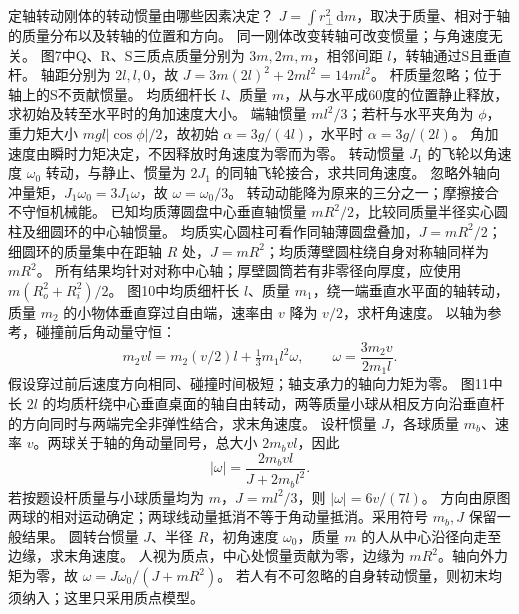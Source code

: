 \problemtext 定轴转动刚体的转动惯量由哪些因素决定？
\workings $J=\int r_\perp^2\,\mathrm dm$，取决于质量、相对于轴的质量分布以及转轴的位置和方向。
\crosscheck 同一刚体改变转轴可改变惯量；与角速度无关。
\problemtext 图7中Q、R、S三质点质量分别为 $3m,2m,m$，相邻间距 $l$，转轴通过S且垂直杆。
\workings 轴距分别为 $2l,l,0$，故 $J=3m(2l)^2+2ml^2=14ml^2$。
\crosscheck 杆质量忽略；位于轴上的S不贡献惯量。
\problemtext 均质细杆长 $l$、质量 $m$，从与水平成60度的位置静止释放，求初始及转至水平时的角加速度大小。
\workings 端轴惯量 $ml^2/3$；若杆与水平夹角为 $\phi$，重力矩大小 $mgl|\cos\phi|/2$，故初始 $\alpha=3g/(4l)$，水平时 $\alpha=3g/(2l)$。
\crosscheck 角加速度由瞬时力矩决定，不因释放时角速度为零而为零。
\problemtext 转动惯量 $J_1$ 的飞轮以角速度 $\omega_0$ 转动，与静止、惯量为 $2J_1$ 的同轴飞轮接合，求共同角速度。
\workings 忽略外轴向冲量矩，$J_1\omega_0=3J_1\omega$，故 $\omega=\omega_0/3$。
\crosscheck 转动动能降为原来的三分之一；摩擦接合不守恒机械能。
\problemtext 已知均质薄圆盘中心垂直轴惯量 $mR^2/2$，比较同质量半径实心圆柱及细圆环的中心轴惯量。
\workings 均质实心圆柱可看作同轴薄圆盘叠加，$J=mR^2/2$；细圆环的质量集中在距轴 $R$ 处，$J=mR^2$；均质薄壁圆柱绕自身对称轴同样为 $mR^2$。
\crosscheck 所有结果均针对对称中心轴；厚壁圆筒若有非零径向厚度，应使用 $m(R_o^2+R_i^2)/2$。
\problemtext 图10中均质细杆长 $l$、质量 $m_1$，绕一端垂直水平面的轴转动，质量 $m_2$ 的小物体垂直穿过自由端，速率由 $v$ 降为 $v/2$，求杆角速度。
\workings 以轴为参考，碰撞前后角动量守恒：
\[
m_2vl=m_2(v/2)l+\tfrac13m_1l^2\omega,\qquad
\omega=\frac{3m_2v}{2m_1l}.
\]
\crosscheck 假设穿过前后速度方向相同、碰撞时间极短；轴支承力的轴向力矩为零。
\problemtext 图11中长 $2l$ 的均质杆绕中心垂直桌面的轴自由转动，两等质量小球从相反方向沿垂直杆的方向同时与两端完全非弹性结合，求末角速度。
\workings 设杆惯量 $J$，各球质量 $m_b$、速率 $v$。两球关于轴的角动量同号，总大小 $2m_bvl$，因此
\[
|\omega|=\frac{2m_bvl}{J+2m_bl^2}.
\]
若按题设杆质量与小球质量均为 $m$，$J=ml^2/3$，则 $|\omega|=6v/(7l)$。
\crosscheck 方向由原图两球的相对运动确定；两球线动量抵消不等于角动量抵消。采用符号 $m_b,J$ 保留一般结果。
\problemtext 圆转台惯量 $J$、半径 $R$，初角速度 $\omega_0$，质量 $m$ 的人从中心沿径向走至边缘，求末角速度。
\workings 人视为质点，中心处惯量贡献为零，边缘为 $mR^2$。轴向外力矩为零，故 $\omega=J\omega_0/(J+mR^2)$。
\crosscheck 若人有不可忽略的自身转动惯量，则初末均须纳入；这里只采用质点模型。
